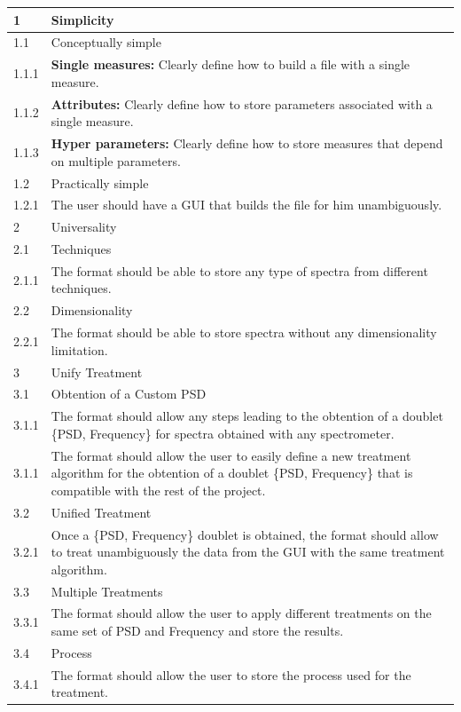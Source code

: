 \documentclass{book}
\begin{document}
\begin{tabular}{|p{1cm}|p{14cm}|}
    \hline
    \cellcolor{gray!50}1 & \cellcolor{gray!50} Simplicity \\ \hline
    \cellcolor{gray!25}1.1 & \cellcolor{gray!25} Conceptually simple  \\ \hline
     1.1.1 &  \textbf{Single measures:} Clearly define how to build a file with a single measure.\\
     1.1.2 &  \textbf{Attributes:} Clearly define how to store parameters associated with a single measure.\\ 
     1.1.3 & \textbf{Hyper parameters:} Clearly define how to store measures that depend on multiple parameters. \\ \hline
    \cellcolor{gray!25}1.2 & \cellcolor{gray!25} Practically simple  \\ \hline
    1.2.1 &  The user should have a GUI that builds the file for him unambiguously.\\ \hline
    
    \cellcolor{gray!50}2 & \cellcolor{gray!50} Universality \\ \hline
    \cellcolor{gray!25}2.1 & \cellcolor{gray!25} Techniques \\ \hline
    2.1.1 &  The format should be able to store any type of spectra from different techniques. \\ \hline
    \cellcolor{gray!25}2.2 & \cellcolor{gray!25} Dimensionality \\ \hline
    2.2.1 &  The format should be able to store spectra without any dimensionality limitation.\\ \hline

    \cellcolor{gray!50}3 & \cellcolor{gray!50} Unify Treatment \\ \hline
    \cellcolor{gray!25}3.1 & \cellcolor{gray!25} Obtention of a Custom PSD \\ \hline
    3.1.1 &  The format should allow any steps leading to the obtention of a doublet \{PSD, Frequency\} for spectra obtained with any spectrometer. \\
    3.1.1 &  The format should allow the user to easily define a new treatment algorithm for the obtention of a doublet \{PSD, Frequency\} that is compatible with the rest of the project. \\ \hline
    \cellcolor{gray!25}3.2 & \cellcolor{gray!25} Unified Treatment \\ \hline
    3.2.1 &  Once a \{PSD, Frequency\} doublet is obtained, the format should allow to treat unambiguously the data from the GUI with the same treatment algorithm.\\ \hline
    \cellcolor{gray!25}3.3 & \cellcolor{gray!25} Multiple Treatments \\ \hline
    3.3.1 &  The format should allow the user to apply different treatments on the same set of PSD and Frequency and store the results.\\ \hline
    \cellcolor{gray!25}3.4 & \cellcolor{gray!25} Process \\ \hline
    3.4.1 &  The format should allow the user to store the process used for the treatment.\\ \hline


\end{tabular}
\end{document}
